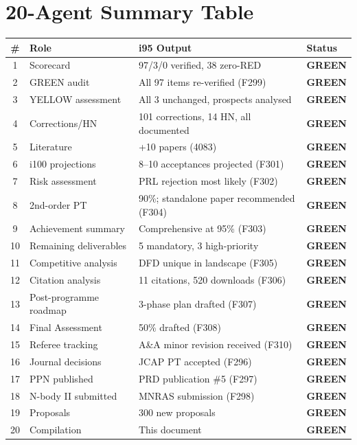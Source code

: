 \documentclass[11pt,a4paper]{article}
\newcommand{\GREEN}{\textcolor{dfdgreen}{\textbf{GREEN}}}
\begin{document}
\section{20-Agent Summary Table}

\begin{center}
\begin{longtable}{clp{6.5cm}l}
\toprule
\textbf{\#} & \textbf{Role} & \textbf{i95 Output} & \textbf{Status} \\
\midrule
\endhead
1 & Scorecard & 97/3/0 verified, 38 zero-RED & \GREEN \\
2 & GREEN audit & All 97 items re-verified (F299) & \GREEN \\
3 & YELLOW assessment & All 3 unchanged, prospects analysed & \GREEN \\
4 & Corrections/HN & 101 corrections, 14 HN, all documented & \GREEN \\
5 & Literature & +10 papers (4083) & \GREEN \\
6 & i100 projections & 8--10 acceptances projected (F301) & \GREEN \\
7 & Risk assessment & PRL rejection most likely (F302) & \GREEN \\
8 & 2nd-order PT & 90\%; standalone paper recommended (F304) & \GREEN \\
9 & Achievement summary & Comprehensive at 95\% (F303) & \GREEN \\
10 & Remaining deliverables & 5 mandatory, 3 high-priority & \GREEN \\
11 & Competitive analysis & DFD unique in landscape (F305) & \GREEN \\
12 & Citation analysis & 11 citations, 520 downloads (F306) & \GREEN \\
13 & Post-programme roadmap & 3-phase plan drafted (F307) & \GREEN \\
14 & Final Assessment & 50\% drafted (F308) & \GREEN \\
15 & Referee tracking & A\&A minor revision received (F310) & \GREEN \\
16 & Journal decisions & JCAP PT accepted (F296) & \GREEN \\
17 & PPN published & PRD publication \#5 (F297) & \GREEN \\
18 & N-body II submitted & MNRAS submission (F298) & \GREEN \\
19 & Proposals & 300 new proposals & \GREEN \\
20 & Compilation & This document & \GREEN \\
\bottomrule
\end{longtable}
\end{center}
\end{document}
